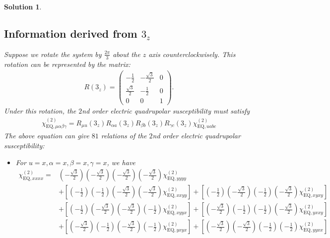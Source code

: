 \documentclass[UTF8,10pt,a4paper]{article}
\theoremstyle{Problem}
\theoremstyle{Solution}
\newtheorem*{sol}{Solution}
\begin{document}
\begin{sol}
    \subsection{Information derived from $3_z$}
    Suppose we rotate the system by $\frac{2\pi}{3}$ about the $z$ axis counterclockwisely. This rotation can be represented by the matrix:
    \begin{align}
        R(3_z)=\left(\begin{matrix}
            -\frac{1}{2}&-\frac{\sqrt{3}}{2}&0\\
            \frac{\sqrt{3}}{2}&-\frac{1}{2}&0\\
            0&0&1
        \end{matrix}\right).
    \end{align}
    Under this rotation, the $2$nd order electric quadrupolar susceptibility must satisfy
    \begin{align}
        \chi_{\text{EQ},\mu\alpha\beta\gamma}^{(2)}=R_{\mu u}(3_z)R_{\alpha a}(3_z)R_{\beta b}(3_z)R_{\gamma c}(3_z)\chi_{\text{EQ},uabc}^{(2)}
    \end{align}
    The above equation can give $81$ relations of the $2$nd order electric quadrupolar susceptibility:
    \begin{itemize}
\item For $u=x,\alpha=x,\beta=x,\gamma=x$, we have
\footnotesize\begin{align}
\nonumber\chi_{\text{EQ},xxxx}^{(2)}=&\left(-\frac{\sqrt{3}}{2}\right)\left(-\frac{\sqrt{3}}{2}\right)\left(-\frac{\sqrt{3}}{2}\right)\left(-\frac{\sqrt{3}}{2}\right)\chi_{\text{EQ},yyyy}^{(2)}\\
\nonumber&+\left[\left(-\frac{1}{2}\right)\left(-\frac{1}{2}\right)\left(-\frac{\sqrt{3}}{2}\right)\left(-\frac{\sqrt{3}}{2}\right)\chi_{\text{EQ},xxyy}^{(2)}\right]+\left[\left(-\frac{1}{2}\right)\left(-\frac{\sqrt{3}}{2}\right)\left(-\frac{1}{2}\right)\left(-\frac{\sqrt{3}}{2}\right)\chi_{\text{EQ},xyxy}^{(2)}\right]\\
\nonumber&+\left[\left(-\frac{1}{2}\right)\left(-\frac{\sqrt{3}}{2}\right)\left(-\frac{\sqrt{3}}{2}\right)\left(-\frac{1}{2}\right)\chi_{\text{EQ},xyyx}^{(2)}\right]+\left[\left(-\frac{\sqrt{3}}{2}\right)\left(-\frac{1}{2}\right)\left(-\frac{1}{2}\right)\left(-\frac{\sqrt{3}}{2}\right)\chi_{\text{EQ},yxxy}^{(2)}\right]\\
\nonumber&+\left[\left(-\frac{\sqrt{3}}{2}\right)\left(-\frac{1}{2}\right)\left(-\frac{\sqrt{3}}{2}\right)\left(-\frac{1}{2}\right)\chi_{\text{EQ},yxyx}^{(2)}\right]+\left[\left(-\frac{\sqrt{3}}{2}\right)\left(-\frac{\sqrt{3}}{2}\right)\left(-\frac{1}{2}\right)\left(-\frac{1}{2}\right)\chi_{\text{EQ},yyxx}^{(2)}\right]\\

\end{align}
\end{itemize}
\end{sol}
\end{document}
